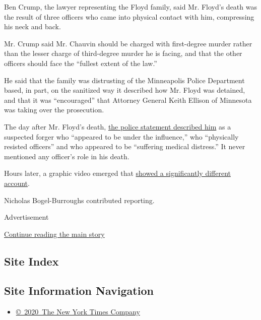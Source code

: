 Ben Crump, the lawyer representing the Floyd family, said Mr. Floyd's
death was the result of three officers who came into physical contact
with him, compressing his neck and back.

Mr. Crump said Mr. Chauvin should be charged with first-degree murder
rather than the lesser charge of third-degree murder he is facing, and
that the other officers should face the ``fullest extent of the law.''

He said that the family was distrusting of the Minneapolis Police
Department based, in part, on the sanitized way it described how Mr.
Floyd was detained, and that it was ``encouraged'' that Attorney General
Keith Ellison of Minnesota was taking over the prosecution.

The day after Mr. Floyd's death,
\href{https://slack-redir.net/link?url=https\%3A\%2F\%2Fwww.nytimes3xbfgragh.onion\%2F2020\%2F05\%2F28\%2Fus\%2Fgeorge-floyd-minneapolis-protests.html}{the
police statement described him} as a suspected forger who ``appeared to
be under the influence,'' who ``physically resisted officers'' and who
appeared to be ``suffering medical distress.'' It never mentioned any
officer's role in his death.

Hours later, a graphic video emerged that
\href{https://www.nytimes3xbfgragh.onion/2020/05/26/us/george-floyd-minneapolis-police.html}{showed
a significantly different account}.

Nicholas Bogel-Burroughs contributed reporting.

Advertisement

\protect\hyperlink{after-bottom}{Continue reading the main story}

\hypertarget{site-index}{%
\subsection{Site Index}\label{site-index}}

\hypertarget{site-information-navigation}{%
\subsection{Site Information
Navigation}\label{site-information-navigation}}

\begin{itemize}
\tightlist
\item
  \href{https://help.nytimes3xbfgragh.onion/hc/en-us/articles/115014792127-Copyright-notice}{©~2020~The
  New York Times Company}
\end{itemize}

